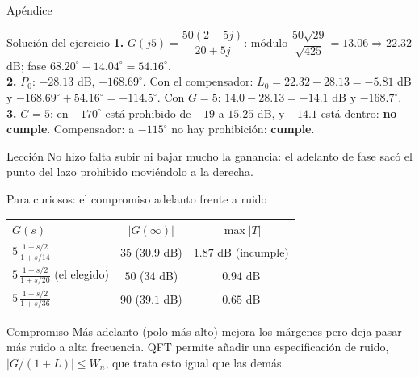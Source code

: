 \documentclass[aspectratio=169,11pt]{beamer}
\begin{document}
\appendix
\begin{frame}\centering\Large Apéndice\end{frame}

\begin{frame}{Solución del ejercicio}
  \small
  \textbf{1.} $G(j5)=\dfrac{50(2+5j)}{20+5j}$: módulo $\dfrac{50\sqrt{29}}{\sqrt{425}}=13.06\Rightarrow22.32$ dB; fase $68.20^\circ-14.04^\circ=54.16^\circ$.\\[3pt]
  \textbf{2.} $P_0$: $-28.13$ dB, $-168.69^\circ$. Con el compensador: $L_0=22.32-28.13=-5.81$ dB y $-168.69^\circ+54.16^\circ=-114.5^\circ$. Con $G=5$: $14.0-28.13=-14.1$ dB y $-168.7^\circ$.\\[3pt]
  \textbf{3.} $G=5$: en $-170^\circ$ está prohibido de $-19$ a $15.25$ dB, y $-14.1$ está dentro: \textbf{no cumple}. Compensador: a $-115^\circ$ no hay prohibición: \textbf{cumple}.
  \begin{block}{Lección}
    No hizo falta subir ni bajar mucho la ganancia: el adelanto de fase sacó el punto del lazo prohibido moviéndolo a la derecha.
  \end{block}
\end{frame}

\begin{frame}{Para curiosos: el compromiso adelanto frente a ruido}
  \small
  \begin{center}
  \begin{tabular}{l|c|c}
    $G(s)$ & $|G(\infty)|$ & $\max|T|$\\\hline
    $5\,\frac{1+s/2}{1+s/14}$ & $35$ ($30.9$ dB) & $1.87$ dB (incumple)\\[2pt]
    $5\,\frac{1+s/2}{1+s/20}$ (el elegido) & $50$ ($34$ dB) & $0.94$ dB\\[2pt]
    $5\,\frac{1+s/2}{1+s/36}$ & $90$ ($39.1$ dB) & $0.65$ dB
  \end{tabular}
  \end{center}
  \begin{block}{Compromiso}
    Más adelanto (polo más alto) mejora los márgenes pero deja pasar más ruido a alta frecuencia. QFT permite añadir una especificación de ruido, $|G/(1+L)|\le W_n$, que trata esto igual que las demás.
  \end{block}
\end{frame}
\end{document}
